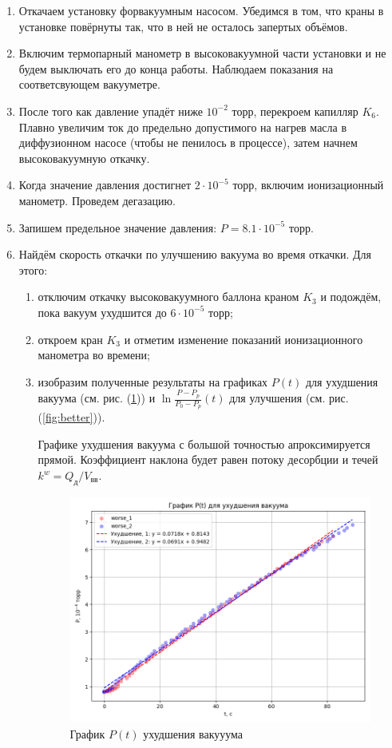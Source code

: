 \documentclass[a4paper,12pt]{article} %
\begin{document}
\begin{enumerate}
    \item Откачаем установку форвакуумным насосом. Убедимся в том, что краны в установке повёрнуты так, что в ней не осталось запертых объёмов.
    \item Включим термопарный манометр в высоковакуумной части установки и не будем выключать его до конца работы. Наблюдаем показания на соответсвующем вакууметре.
    \item После того как давление упадёт ниже $10^{-2}$ торр, перекроем капилляр $K_6$. Плавно увеличим ток до предельно допустимого на нагрев масла в диффузионном насосе (чтобы не пенилось в процессе), затем начнем высоковакуумную откачку.
    \item Когда значение давления достигнет $2 \cdot 10^{-5}$ торр, включим ионизационный манометр. Проведем дегазацию. 
    \item Запишем предельное значение давления: $P = 8.1 \cdot 10^{-5}$ торр.
    \item Найдём скорость откачки по улучшению вакуума во время откачки. Для этого:
    \begin{enumerate}
        \item отключим откачку высоковакуумного баллона краном $K_3$ и подождём, пока вакуум ухудшится до \( 6 \cdot 10^{-5} \) торр;
        \item откроем кран $K_3$ и отметим изменение показаний ионизационного манометра во времени;
        \item изобразим полученные результаты на графиках $P(t)$ для ухудшения вакуума (см. рис. (\ref{fig:worse})) и \( \ln \frac{P - P_p}{P_0 - P_p} (t) \) для улучшения (см. рис. (\ref{fig:better})). 
        
        Графике ухудшения вакуума с большой точностью апроксимируется прямой. Коэффициент наклона будет равен потоку десорбции и течей $k^w = Q_\text{д}/V_\text{вв}$.

        \begin{figure}[h!]
          \centering
          \includegraphics[scale = 0.75]{graph_worse.png}
          \caption{График $P(t)$ ухудшения вакууума}
          \label{fig:worse}
        \end{figure}
        

\end{enumerate}
\end{enumerate}
\end{document}
